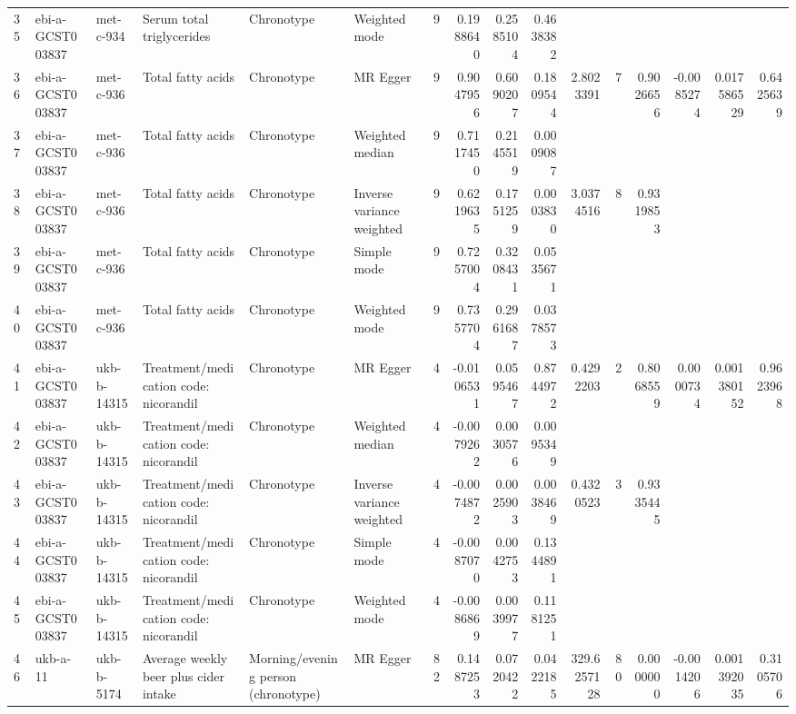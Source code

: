 \begin{table}[ht]
\begin{tabular}{llllllrrrrrrrrrr}
  35 & ebi-a-GCST003837 & met-c-934 & Serum total triglycerides & Chronotype & Weighted mode & 9 & 0.1988640 & 0.2585104 & 0.4638382 &  &  &  &  &  &  \\ 
  36 & ebi-a-GCST003837 & met-c-936 & Total fatty acids & Chronotype & MR Egger & 9 & 0.9047956 & 0.6090207 & 0.1809544 & 2.8023391 & 7 & 0.9026656 & -0.0085274 & 0.017586529 & 0.6425639 \\ 
  37 & ebi-a-GCST003837 & met-c-936 & Total fatty acids & Chronotype & Weighted median & 9 & 0.7117450 & 0.2145519 & 0.0009087 &  &  &  &  &  &  \\ 
  38 & ebi-a-GCST003837 & met-c-936 & Total fatty acids & Chronotype & Inverse variance weighted & 9 & 0.6219635 & 0.1751259 & 0.0003830 & 3.0374516 & 8 & 0.9319853 &  &  &  \\ 
  39 & ebi-a-GCST003837 & met-c-936 & Total fatty acids & Chronotype & Simple mode & 9 & 0.7257004 & 0.3208431 & 0.0535671 &  &  &  &  &  &  \\ 
  40 & ebi-a-GCST003837 & met-c-936 & Total fatty acids & Chronotype & Weighted mode & 9 & 0.7357704 & 0.2961687 & 0.0378573 &  &  &  &  &  &  \\ 
  41 & ebi-a-GCST003837 & ukb-b-14315 & Treatment/medication code: nicorandil & Chronotype & MR Egger & 4 & -0.0106531 & 0.0595467 & 0.8744972 & 0.4292203 & 2 & 0.8068559 & 0.0000734 & 0.001380152 & 0.9623968 \\ 
  42 & ebi-a-GCST003837 & ukb-b-14315 & Treatment/medication code: nicorandil & Chronotype & Weighted median & 4 & -0.0079262 & 0.0030576 & 0.0095349 &  &  &  &  &  &  \\ 
  43 & ebi-a-GCST003837 & ukb-b-14315 & Treatment/medication code: nicorandil & Chronotype & Inverse variance weighted & 4 & -0.0074872 & 0.0025903 & 0.0038469 & 0.4320523 & 3 & 0.9335445 &  &  &  \\ 
  44 & ebi-a-GCST003837 & ukb-b-14315 & Treatment/medication code: nicorandil & Chronotype & Simple mode & 4 & -0.0087070 & 0.0042753 & 0.1344891 &  &  &  &  &  &  \\ 
  45 & ebi-a-GCST003837 & ukb-b-14315 & Treatment/medication code: nicorandil & Chronotype & Weighted mode & 4 & -0.0086869 & 0.0039977 & 0.1181251 &  &  &  &  &  &  \\ 
  46 & ukb-a-11 & ukb-b-5174 & Average weekly beer plus cider intake & Morning/evening person (chronotype) & MR Egger & 82 & 0.1487253 & 0.0720422 & 0.0422185 & 329.6257128 & 80 & 0.0000000 & -0.0014206 & 0.001392035 & 0.3105706 \\ 

\end{tabular}
\end{table}
